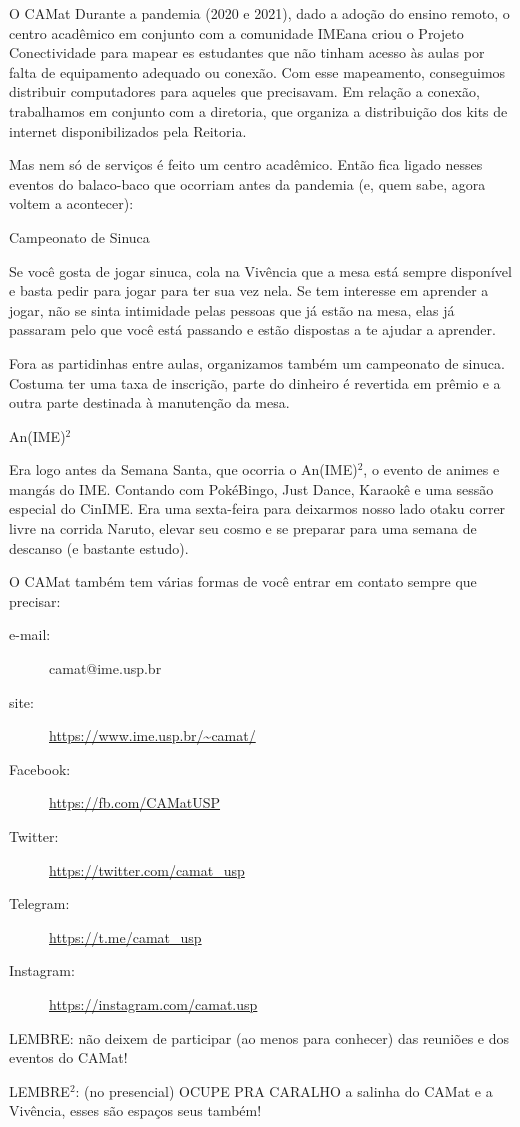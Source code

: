 \begin{secao}{O CAMat}
Durante a pandemia (2020 e 2021), dado a adoção do ensino remoto, o centro acadêmico em
conjunto com a comunidade IMEana criou o Projeto Conectividade para mapear es estudantes que não tinham
acesso às aulas por falta de equipamento adequado ou conexão. Com esse mapeamento, conseguimos distribuir computadores para aqueles que
precisavam. Em relação a conexão, trabalhamos em conjunto com a diretoria, que organiza a distribuição dos kits de internet disponibilizados pela Reitoria.
  
Mas nem só de serviços é feito um centro acadêmico. Então fica ligado nesses
eventos do balaco-baco que ocorriam antes da pandemia (e, quem sabe, agora voltem a acontecer):

\begin{subsecao}{Campeonato de Sinuca}

Se você gosta de jogar sinuca, cola na Vivência que a mesa está sempre disponível
e basta pedir para jogar para ter sua vez nela. Se tem interesse em aprender a jogar,
não se sinta intimidade pelas pessoas que já estão na mesa, elas já passaram pelo
que você está passando e estão dispostas a te ajudar a aprender.

Fora as partidinhas entre aulas, organizamos também um campeonato de sinuca. Costuma
ter uma taxa de inscrição, parte do dinheiro é revertida em prêmio e a outra parte
destinada à manutenção da mesa.

\end{subsecao}

\begin{subsecao}{An(IME)\texorpdfstring{$^2$}{²}}

Era logo antes da Semana Santa, que ocorria o An(IME)$^2$, o evento de animes e
mangás do IME. Contando com PokéBingo, Just Dance, Karaokê e uma sessão especial do CinIME.
Era uma sexta-feira para deixarmos nosso lado otaku correr livre na corrida Naruto,
elevar seu cosmo e se preparar para uma semana de descanso (e bastante estudo).

\end{subsecao}


O CAMat também tem várias formas de você entrar em contato sempre que precisar:

\begin{description}
\item [e-mail:] camat@ime.usp.br
\item [site:] \url{https://www.ime.usp.br/~camat/}
\item [Facebook:] \url{https://fb.com/CAMatUSP}
\item [Twitter:] \url{https://twitter.com/camat_usp}
\item [Telegram:] \url{https://t.me/camat_usp}
\item [Instagram:] \url{https://instagram.com/camat.usp}
\end{description}

LEMBRE: não deixem de participar (ao menos para conhecer) das reuniões e dos eventos do CAMat!

LEMBRE$^2$: (no presencial) OCUPE PRA CARALHO a salinha do CAMat e a Vivência,
esses são espaços seus também!

\end{secao}
